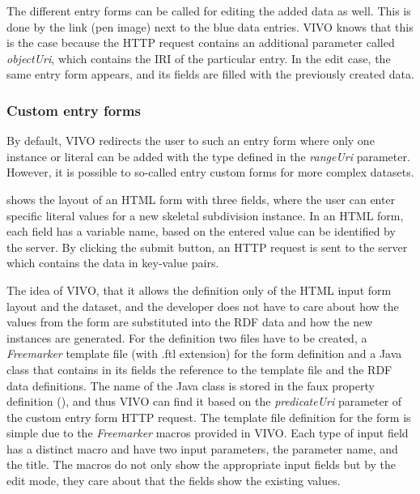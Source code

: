 The different entry forms can be called for editing the added data as well. This is done by the link (pen image) next to the blue data entries. VIVO knows that this is the case because the HTTP request contains an additional parameter called \textit{objectUri}, which contains the IRI of the particular entry. In the edit case, the same entry form appears, and its fields are filled with the previously created data.

\subsubsection{Custom entry forms} \label{vivoCef}

By default, VIVO redirects the user to such an entry form where only one instance or literal can be added with the type defined in the \textit{rangeUri} parameter. However, it is possible to so-called entry custom forms for more complex datasets.


 shows the layout of an HTML form with three fields, where the user can enter specific literal values for a new skeletal subdivision instance. In an HTML form, each field has a variable name, based on the entered value can be identified by the server. By clicking the submit button, an HTTP request is sent to the server which contains the data in key-value pairs.

The idea of VIVO, that it allows the definition only of the HTML input form layout and the dataset, and the developer does not have to care about how the values from the form are substituted into the RDF data and how the new instances are generated. For the definition two files have to be created, a \textit{Freemarker}  template file (with .ftl extension) for the form definition and a Java class that contains in its fields the reference to the template file and the RDF data definitions. The name of the Java class is stored in the faux property definition (), and thus VIVO can find it based on the \textit{predicateUri} parameter of the custom entry form HTTP request. The template file definition for the form is simple due to the \textit{Freemarker} macros provided in VIVO. Each type of input field has a distinct macro and have two input parameters, the parameter name, and the title. The macros do not only show the appropriate input fields but by the edit mode, they care about that the fields show the existing values.

